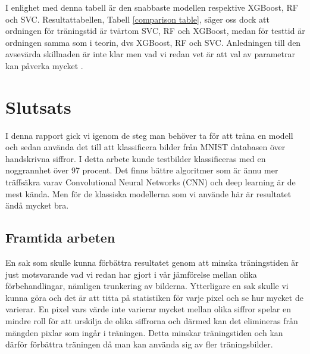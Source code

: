 \documentclass[12pt,a4paper]{article}
\begin{document}
I enlighet med denna tabell är den snabbaste modellen respektive XGBoost, RF och SVC. Resultattabellen, Tabell \ref{comparison table}, säger oss dock att ordningen för träningstid är tvärtom SVC, RF och XGBoost, medan för testtid är ordningen samma som i teorin, dvs XGBoost, RF och SVC. Anledningen till den avsevärda skillnaden är inte klar men vad vi redan vet är att val av parametrar kan påverka mycket \citep{Geron}.


\section{Slutsats}

I denna rapport gick vi igenom de steg man behöver ta för att träna en modell och sedan använda det till att klassificera bilder från MNIST databasen över handskrivna siffror. I detta arbete kunde testbilder klassificeras med en noggrannhet över 97 procent. Det finns bättre algoritmer som är ännu mer träffsäkra varav Convolutional Neural Networks (CNN) och deep learning är de mest kända. Men för de klassiska modellerna som vi använde här är resultatet ändå mycket bra.

\subsection{Framtida arbeten}

En sak som skulle kunna förbättra resultatet genom att minska träningstiden är just motsvarande vad vi redan har gjort i vår jämförelse mellan olika förbehandlingar, nämligen trunkering av bilderna. Ytterligare en sak skulle vi kunna göra och det är att titta på statistiken för varje pixel och se hur mycket de varierar. En pixel vars värde inte varierar mycket mellan olika siffror spelar en mindre roll för att urskilja de olika siffrorna och därmed kan det elimineras från mängden pixlar som ingår i träningen. Detta minskar träningstiden och kan därför förbättra träningen då man kan använda sig av fler träningsbilder.
\end{document}
